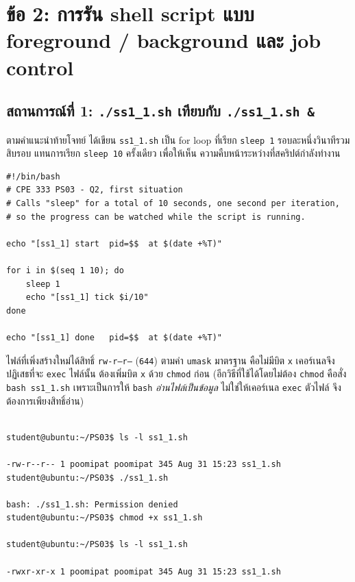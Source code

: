 \documentclass[a4paper,11pt]{article}
\newcommand{\code}[1]{\texttt{#1}}
\begin{document}
\section{ข้อ 2: การรัน shell script แบบ foreground / background และ job control}

\subsection{สถานการณ์ที่ 1: \code{./ss1\_1.sh} เทียบกับ \code{./ss1\_1.sh \&}}

ตามคำแนะนำท้ายโจทย์ ได้เขียน \code{ss1\_1.sh} เป็น for loop ที่เรียก \code{sleep 1}
รอบละหนึ่งวินาทีรวมสิบรอบ แทนการเรียก \code{sleep 10} ครั้งเดียว เพื่อให้เห็น
ความคืบหน้าระหว่างที่สคริปต์กำลังทำงาน

\begin{lstlisting}[style=bashstyle,caption={ss1\_1.sh},label={lst:ss1_1}]
#!/bin/bash
# CPE 333 PS03 - Q2, first situation
# Calls "sleep" for a total of 10 seconds, one second per iteration,
# so the progress can be watched while the script is running.

echo "[ss1_1] start  pid=$$  at $(date +%T)"

for i in $(seq 1 10); do
    sleep 1
    echo "[ss1_1] tick $i/10"
done

echo "[ss1_1] done   pid=$$  at $(date +%T)"
\end{lstlisting}

ไฟล์ที่เพิ่งสร้างใหม่ได้สิทธิ์ \code{rw-r--r--} (\code{644}) ตามค่า \code{umask}
มาตรฐาน คือไม่มีบิต \code{x} เคอร์เนลจึงปฏิเสธที่จะ \code{exec} ไฟล์นั้น
ต้องเพิ่มบิต \code{x} ด้วย \code{chmod} ก่อน (อีกวิธีที่ใช้ได้โดยไม่ต้อง \code{chmod}
คือสั่ง \code{bash ss1\_1.sh} เพราะเป็นการให้ \code{bash} \emph{อ่านไฟล์เป็นข้อมูล}
ไม่ใช่ให้เคอร์เนล \code{exec} ตัวไฟล์ จึงต้องการเพียงสิทธิ์อ่าน)

\begin{lstlisting}[style=terminal,caption={Permission denied และการแก้ด้วย chmod}]

student@ubuntu:~/PS03$ ls -l ss1_1.sh

-rw-r--r-- 1 poomipat poomipat 345 Aug 31 15:23 ss1_1.sh
student@ubuntu:~/PS03$ ./ss1_1.sh

bash: ./ss1_1.sh: Permission denied
student@ubuntu:~/PS03$ chmod +x ss1_1.sh

student@ubuntu:~/PS03$ ls -l ss1_1.sh

-rwxr-xr-x 1 poomipat poomipat 345 Aug 31 15:23 ss1_1.sh
\end{lstlisting}
\end{document}
